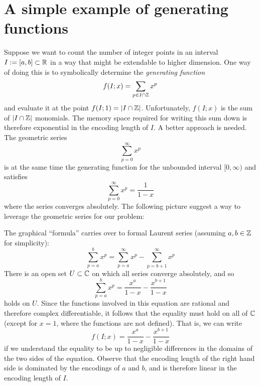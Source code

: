\section{A simple example of generating functions}

Suppose we want to count the number of integer points in an interval $I := [a,b] \subset \mathbb{R}$
in a way that might be extendable to higher dimension.
One way of doing this is to symbolically determine the \emph{generating function}
\[
  f(I;x) = \sum_{p \in I \cap \mathbb{Z}} x^p
\]
and evaluate it at the point $f(I;1) = |I \cap \mathbb{Z}|$.
Unfortunately, $f(I;x)$ is the sum of $|I \cap \mathbb{Z}|$ monomials.
The memory space required for writing this sum down is therefore exponential in the encoding length of $I$.
A better approach is needed. The geometric series
\[
  \sum_{p = 0}^\infty x^p
\]
is at the same time the generating function for the unbounded interval $[0,\infty)$
and satisfies
\[
  \sum_{p = 0}^\infty x^p = \frac{1}{1 - x}
\]
where the series converges absolutely.
The following picture suggest a way to leverage the geometric series for our problem:
\begin{center}
\end{center}
The graphical ``formula'' carries over to formal Laurent series (assuming $a, b \in \mathbb{Z}$ for simplicity):
\[
  \sum_{p = a}^b x^p = \sum_{p = a}^\infty x^p - \sum_{p = b+1}^\infty x^p
\]
There is an open set $U \subset \mathbb{C}$ on which all series converge absolutely,
and so
\[
  \sum_{p = a}^b x^p = \frac{x^a}{1 - x} - \frac{x^{b + 1}}{1 - x}
\]
holds on $U$.
Since the functions involved in this equation are rational and therefore complex differentiable,
it follows that the equality must hold on all of $\mathbb{C}$ (except for $x = 1$, where the functions are not defined).
That is, we can write
\[
  f(I;x) = \frac{x^a}{1 - x} - \frac{x^{b + 1}}{1 - x}
\]
if we understand the equality to be up to negligible differences in the domains of the two sides of the equation.
Observe that the encoding length of the right hand side is dominated by the encodings of $a$ and $b$,
and is therefore linear in the encoding length of $I$.

